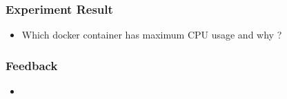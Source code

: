 \begin{frame}
\frametitle{Experiment Result}
\begin{itemize}
	
	\item Which docker container has maximum CPU usage and why ?
	
\end{itemize}
\end{frame}

\begin{frame}
\frametitle{Feedback}
\begin{itemize}
	
	\item 
	
\end{itemize}
\end{frame}